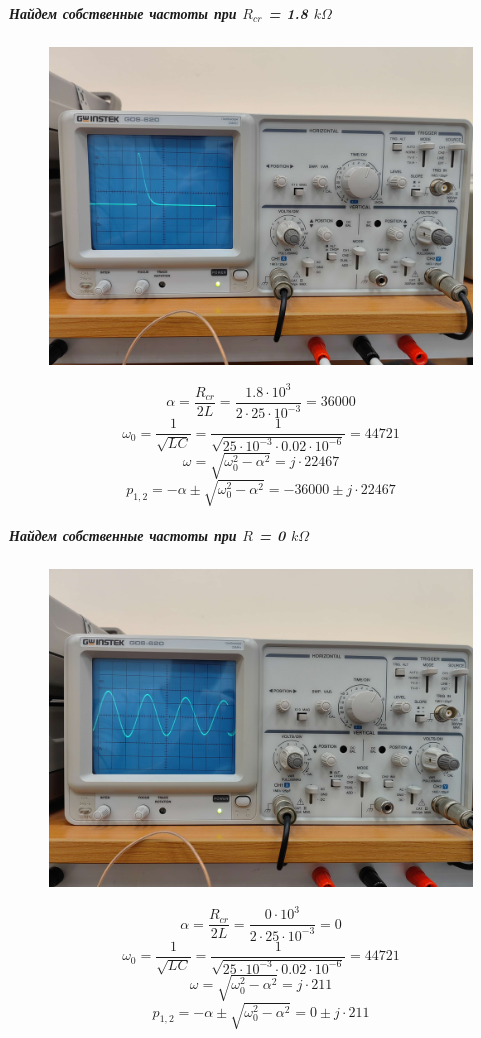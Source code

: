 \documentclass[a4paper,12pt]{report}
\begin{document}
\begin{flushleft}
\newpage
\subparagraph*{Найдем собственные частоты при $R_{cr}$ = 1.8 $k\Omega$}
\begin{figure}[h!]
  \includegraphics[width=1\textwidth]{graph4.jpg}
  \label{ris:image6}
\end{figure}
\[ \alpha = \frac{R_{cr}}{2L} = \frac{1.8\cdot 10^3}{2\cdot 25\cdot 10^{-3}} = 36000 \]
\[ \omega_0 = \frac{1}{\sqrt{LC}} = \frac{1}{\sqrt{25\cdot 10^{-3}\cdot 0.02\cdot 10^{-6}}} = 44721 \]
\[ \omega = \sqrt{\omega_0^2 - \alpha^2} = j \cdot 22467 \]
\[ p_{1,2} = -\alpha \pm \sqrt{\omega_0^2 - \alpha^2} = -36000 \pm j\cdot 22467 \]

\newpage
\subparagraph*{Найдем собственные частоты при $R$ = 0 $k\Omega$}
\begin{figure}[h!]
  \includegraphics[width=1\textwidth]{graph5.jpg}
  \label{ris:image7}
\end{figure}
\[ \alpha = \frac{R_{cr}}{2L} = \frac{0\cdot 10^3}{2\cdot 25\cdot 10^{-3}} = 0 \]
\[ \omega_0 = \frac{1}{\sqrt{LC}} = \frac{1}{\sqrt{25\cdot 10^{-3}\cdot 0.02\cdot 10^{-6}}} = 44721 \]
\[ \omega = \sqrt{\omega_0^2 - \alpha^2} = j \cdot 211 \]
\[ p_{1,2} = -\alpha \pm \sqrt{\omega_0^2 - \alpha^2} = 0 \pm j\cdot 211 \]


\end{flushleft}
\end{document}
